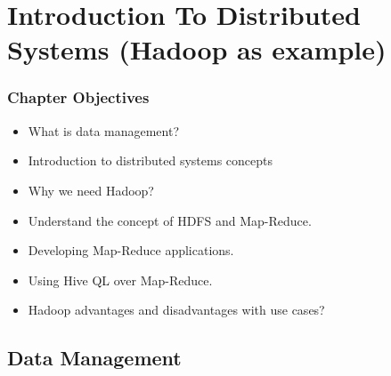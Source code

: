 \section{Introduction To Distributed Systems (Hadoop as example)}


\begin{frame}
\frametitle{Chapter Objectives}

\begin{itemize}
	\item<1-> What is data management? \pause
	\item<2-> Introduction to distributed systems concepts \pause
	\item<3-> Why we need Hadoop? \pause
	\item<4-> Understand the concept of HDFS and Map-Reduce.
	\item<5-> Developing Map-Reduce applications. \pause
	\item<5-> Using Hive QL over Map-Reduce. \pause
	\item<7-> Hadoop advantages and disadvantages with use cases? \pause
\end{itemize}

\end{frame}


\subsection{Data Management}

